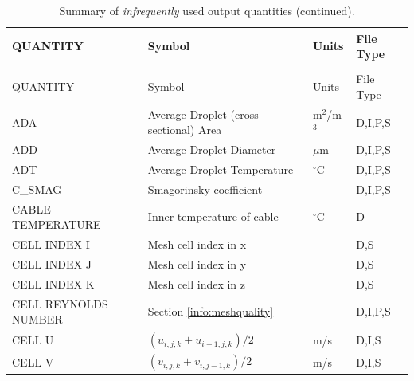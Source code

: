 \documentclass[11pt]{book}
\begin{document}
\begin{longtable}{@{\extracolsep{\fill}}|l|l|l|l|}
\caption[Infrequently used output quantities]{Summary of {\em infrequently} used output quantities.}
\label{tab:oddoutput} \\
\hline
{\ct QUANTITY}                           & Symbol                                        & Units          & File Type    \\
\hline \hline
\endfirsthead
\caption[]{Summary of {\em infrequently} used output quantities (continued).} \\
\hline
{\ct QUANTITY}                           & Symbol                                        & Units          & File Type    \\
\hline \hline
\endhead
{\ct ADA}                                       & Average Droplet (cross sectional) Area            & m$^2$/m$^3$    & D,I,P,S      \\ \hline
{\ct ADD}                                       & Average Droplet Diameter                          & $\mu$m         & D,I,P,S      \\ \hline
{\ct ADT}                                       & Average Droplet Temperature                       & $^\circ$C      & D,I,P,S      \\ \hline
{\ct C\_SMAG}                                   & Smagorinsky coefficient                           &                & D,I,P,S      \\ \hline
{\ct CABLE TEMPERATURE}                         & Inner temperature of cable                        & $^\circ$C      & D            \\ \hline
{\ct CELL INDEX I}                              & Mesh cell index in x                              &                & D,S          \\ \hline
{\ct CELL INDEX J}                              & Mesh cell index in y                              &                & D,S          \\ \hline
{\ct CELL INDEX K}                              & Mesh cell index in z                              &                & D,S          \\ \hline
{\ct CELL REYNOLDS NUMBER}                      & Section \ref{info:meshquality}                    &                & D,I,P,S      \\ \hline
{\ct CELL U}                                    & $(u_{i,j,k}+u_{i-1,j,k})/2$                       & m/s            & D,I,S        \\ \hline
{\ct CELL V}                                    & $(v_{i,j,k}+v_{i,j-1,k})/2$                       & m/s            & D,I,S        \\ \hline

\end{longtable}
\end{document}
